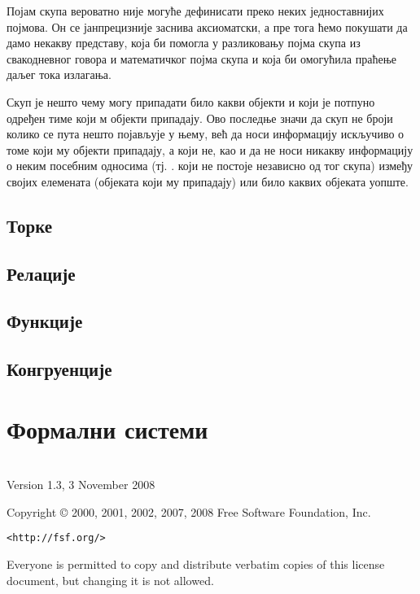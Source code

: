 \documentclass[a4paper]{book}
\newcommand{\tj}{\mbox{тј.} }
\begin{document}
\indent

Појам скупа вероватно није могуће дефинисати преко неких једноставнијих појмова. Он се јанпрецизније
заснива аксиоматски, а пре тога ћемо покушати да дамо некакву представу, која би помогла у разликовању
појма скупа из свакодневног говора и математичког појма скупа и која би омогућила праћење даљег тока
излагања.

Скуп је нешто чему могу припадати било какви објекти и који је потпуно одређен тиме који м објекти
припадају. Ово последње значи да скуп не броји колико се пута нешто појављује у њему, већ да
носи информацију искључиво о томе који му објекти припадају, а који не, као и да не носи никакву
информацију о неким посебним односима (\tj. који не постоје независно од тог скупа) између својих
елемената (објеката који му припадају) или било каквих објеката уопште.

\section{Торке}

\section{Релације}

\section{Функције}

\section{Конгруенције}
	
\chapter{Формални системи}

\chapter*{}

 \begin{center}

       Version 1.3, 3 November 2008


 Copyright \copyright{} 2000, 2001, 2002, 2007, 2008  Free Software Foundation, Inc.
 
 \bigskip
 
     \texttt{<http://fsf.org/>}
  
 \bigskip
 
 Everyone is permitted to copy and distribute verbatim copies
 of this license document, but changing it is not allowed.
\end{center}
\end{document}
